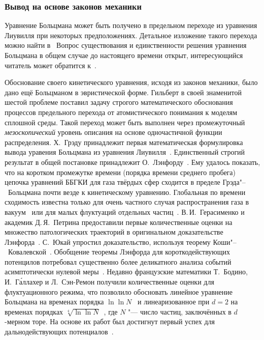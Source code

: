 
\subsubsection{Вывод на основе законов механики}

Уравнение Больцмана может быть получено в предельном переходе из уравнения Лиувилля
при некоторых предположениях. Детальное изложение такого перехода можно найти в~\cite{Grad1970, Sone2007}
Вопрос существования и единственности решения уравнения Больцмана в общем случае до настоящего времени открыт,
интересующийся читатель может обратится к~\cite{Cercignani1994a, Villani2002, Strain2011}.

Обоснование своего кинетического уравнения, исходя из законов механики, было дано ещё Больцманом в эвристической форме.
Гильберт в своей знаменитой шестой проблеме поставил задачу строгого математического обоснования
процессов предельного перехода от атомистического понимания к моделям сплошной среды.
Такой переход может быть выполнен через промежуточный \emph{мезоскопический} уровень описания
на основе одночастичной функции распределения.
Х.~Грэду принадлежит первая математическая формулировка вывода уравения Больцмана из уравнения Лиувилля~\cite{Grad1949}.
Единственный строгий результат в общей постановке принадлежит О.~Лэнфорду~\cite{Lanford1975}.
Ему удалось показать, что на коротком промежутке времени (порядка времени среднего пробега)
цепочка уравнений ББГКИ для газа твёрдых сфер сходится в пределе Грэда"--~Больцмана почти везде к кинетическому уравнению.
Глобальная по времени сходимость известна только для очень частного случая распространения газа в вакуум~\cite{Illner1989}
или для малых флуктуаций отдельных частиц~\cite{Beijeren1980}.
В.\,И.~Герасименко и академик Д.\,Я.~Петрина предоставили первые количественные оценки на множество патологических
траекторий в оригинальном доказательстве Лэнфорда~\cite{Petrina1990}.
С.~Юкай упростил доказательство, используя теорему Коши"--~Ковалевской~\cite{Ukai2001}.
Обобщение теоремы Лэнфорда для короткодействующих потенцилов потребовал существенно более деликатного
анализа событий асимптотически нулевой меры~\cite{Raymond2013, Pulvirenti2014}.
Недавно французские математики Т.~Бодино, И.~Г\'{а}ллахер и Л.~Сэн-Ремон получили количественные оценки для флуктуационного режима,
что позволило обосновать линейное уравнение Больцмана на временах порядка \(\ln\ln{N}\)~\cite{Raymond2016}
и линеаризованное при \(d=2\) на временах порядках \(\sqrt[4]{\ln\ln{N}}\)~\cite{Raymond2017},
где \(N\) "--- число частиц, заключённых в \(d\)-мерном торе.
На основе их работ был достигнут первый успех для дальнодействующих потенциалов~\cite{Ayi2017}.

